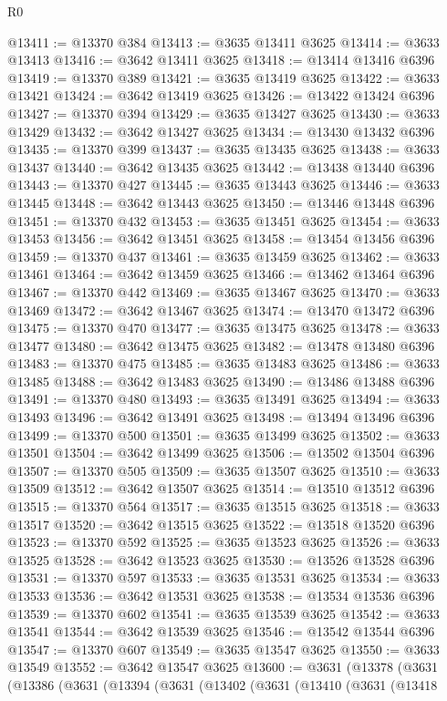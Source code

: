 \begin{lexlean}{R0}
\begin{coremodule}
@13411 := @13370 @384
@13413 := @3635 @13411 @3625
@13414 := @3633 @13413
@13416 := @3642 @13411 @3625
@13418 := @13414 @13416 @6396
@13419 := @13370 @389
@13421 := @3635 @13419 @3625
@13422 := @3633 @13421
@13424 := @3642 @13419 @3625
@13426 := @13422 @13424 @6396
@13427 := @13370 @394
@13429 := @3635 @13427 @3625
@13430 := @3633 @13429
@13432 := @3642 @13427 @3625
@13434 := @13430 @13432 @6396
@13435 := @13370 @399
@13437 := @3635 @13435 @3625
@13438 := @3633 @13437
@13440 := @3642 @13435 @3625
@13442 := @13438 @13440 @6396
@13443 := @13370 @427
@13445 := @3635 @13443 @3625
@13446 := @3633 @13445
@13448 := @3642 @13443 @3625
@13450 := @13446 @13448 @6396
@13451 := @13370 @432
@13453 := @3635 @13451 @3625
@13454 := @3633 @13453
@13456 := @3642 @13451 @3625
@13458 := @13454 @13456 @6396
@13459 := @13370 @437
@13461 := @3635 @13459 @3625
@13462 := @3633 @13461
@13464 := @3642 @13459 @3625
@13466 := @13462 @13464 @6396
@13467 := @13370 @442
@13469 := @3635 @13467 @3625
@13470 := @3633 @13469
@13472 := @3642 @13467 @3625
@13474 := @13470 @13472 @6396
@13475 := @13370 @470
@13477 := @3635 @13475 @3625
@13478 := @3633 @13477
@13480 := @3642 @13475 @3625
@13482 := @13478 @13480 @6396
@13483 := @13370 @475
@13485 := @3635 @13483 @3625
@13486 := @3633 @13485
@13488 := @3642 @13483 @3625
@13490 := @13486 @13488 @6396
@13491 := @13370 @480
@13493 := @3635 @13491 @3625
@13494 := @3633 @13493
@13496 := @3642 @13491 @3625
@13498 := @13494 @13496 @6396
@13499 := @13370 @500
@13501 := @3635 @13499 @3625
@13502 := @3633 @13501
@13504 := @3642 @13499 @3625
@13506 := @13502 @13504 @6396
@13507 := @13370 @505
@13509 := @3635 @13507 @3625
@13510 := @3633 @13509
@13512 := @3642 @13507 @3625
@13514 := @13510 @13512 @6396
@13515 := @13370 @564
@13517 := @3635 @13515 @3625
@13518 := @3633 @13517
@13520 := @3642 @13515 @3625
@13522 := @13518 @13520 @6396
@13523 := @13370 @592
@13525 := @3635 @13523 @3625
@13526 := @3633 @13525
@13528 := @3642 @13523 @3625
@13530 := @13526 @13528 @6396
@13531 := @13370 @597
@13533 := @3635 @13531 @3625
@13534 := @3633 @13533
@13536 := @3642 @13531 @3625
@13538 := @13534 @13536 @6396
@13539 := @13370 @602
@13541 := @3635 @13539 @3625
@13542 := @3633 @13541
@13544 := @3642 @13539 @3625
@13546 := @13542 @13544 @6396
@13547 := @13370 @607
@13549 := @3635 @13547 @3625
@13550 := @3633 @13549
@13552 := @3642 @13547 @3625
@13600 := @3631
    (@13378
      (@3631
        (@13386
          (@3631
            (@13394
              (@3631
                (@13402
                  (@3631
                    (@13410
                      (@3631
                        (@13418

\end{coremodule}
\end{lexlean}
